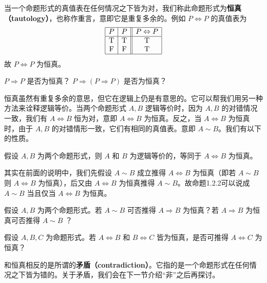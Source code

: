 当一个命题形式的真值表在任何情况之下皆为对，我们称此命题形式为\textbf{恒真（tautology）}，也称作重言，意即它是重复多余的。例如 \(P \Leftrightarrow P\) 的真值表为%
\[
\begin{array}{|c|c||c|}
\hline
P & P & P \Leftrightarrow P \\
\hline
\mathrm{T} & \mathrm{T} & \mathrm{T} \\
\mathrm{F} & \mathrm{F} & \mathrm{T} \\
\hline
\end{array}
\]
故 \(P \Leftrightarrow P\) 为恒真。

\begin{question}
\(P \Rightarrow P\) 是否为恒真？ \(P \Rightarrow (P \Rightarrow P)\) 是否为恒真？
\end{question}

恒真虽然有重复多余的意思，但它在逻辑上仍是有意思的。它可以帮我们用另一种方法来诠释逻辑等价。当两个命题形式 \(A, B\) 逻辑等价时，因为 \(A, B\) 的对错情况一致，我们有 \(A \Leftrightarrow B\) 恒为对，意即 \(A \Leftrightarrow B\) 为恒真。反之，当 \(A \Leftrightarrow B\) 为恒真时，由于 \(A, B\) 的对错情形一致，它们有相同的真值表。意即 \(A \sim B\)。我们有以下的性质。

\begin{proposition}
假设 \(A, B\) 为两个命题形式，则 \(A\) 和 \(B\) 为逻辑等价的，等同于 \(A \Leftrightarrow B\) 为恒真。
\end{proposition}

其实在前面的说明中，我们先假设 \(A \sim B\) 成立推得 \(A \Leftrightarrow B\) 为恒真（即若 \(A \sim B\) 则 \(A \Leftrightarrow B\) 为恒真），后又由 \(A \Leftrightarrow B\) 为恒真推得 \(A \sim B\)。故命题1.2.2可以说成 \(A \sim B\) 当且仅当 \(A \Leftrightarrow B\) 为恒真。

\begin{question}
假设 \(A, B\) 为两个命题形式。若 \(A \sim B\) 可否推得 \(A \Rightarrow B\) 为恒真？若 \(A \Rightarrow B\) 为恒真可否推得 \(A \sim B\) ？
\end{question}

\begin{question}
假设 \(A, B, C\) 为命题形式。若 \(A \Leftrightarrow B\) 和 \(B \Leftrightarrow C\) 皆为恒真，是否可推得 \(A \Leftrightarrow C\) 为恒真？
\end{question}

和恒真相反的是所谓的\textbf{矛盾（contradiction）}。它指的是一个命题形式在任何情况之下皆为错的。关于矛盾，我们会在下一节介绍“非”之后再探讨。

